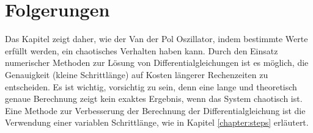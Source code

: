 %
%
%
\section{Folgerungen
\label{vanderpol:section:folgerungen}}
Das Kapitel zeigt daher, wie der Van der Pol Oszillator, indem bestimmte Werte erfüllt werden, ein chaotisches Verhalten haben kann. Durch den Einsatz numerischer Methoden zur Lösung von Differentialgleichungen ist es möglich, die Genauigkeit (kleine Schrittlänge) auf Kosten längerer Rechenzeiten zu entscheiden. Es ist wichtig, vorsichtig zu sein, denn eine lange und theoretisch genaue Berechnung zeigt kein exaktes Ergebnis, wenn das System chaotisch ist. 
Eine Methode zur Verbesserung der Berechnung der Differentialgleichung ist die Verwendung einer variablen Schrittlänge, wie in Kapitel \ref{chapter:steps} erläutert. 
%
